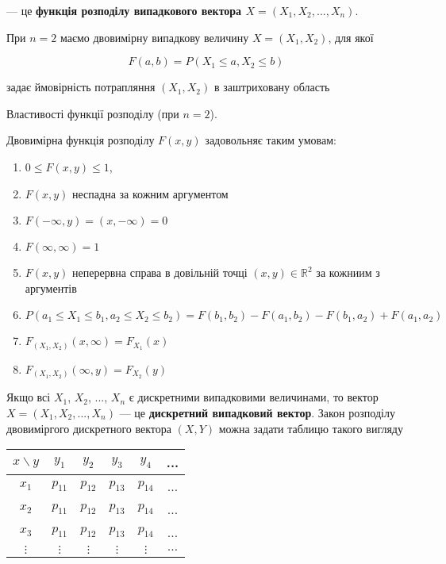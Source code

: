 --- це \textbf{функція розподілу випадкового вектора $X = (X_1, X_2, ..., X_n)$}.

При $n = 2$ маємо двовимірну випадкову величину $X = (X_1, X_2)$, для якої 

$$F(a, b)
= P(X_1 \leqslant a, X_2 \leqslant b)$$

задає ймовірність потрапляння $(X_1, X_2)$ в заштриховану область

\beautifulImage

Властивості функції розподілу (при $n = 2$).

\begin{theorem}Двовимірна функція розподілу $F(x, y)$ задовольняє таким умовам:
    \begin{enumerate}
        \item $0 \leqslant F(x, y) \leqslant 1$,
        \item $F(x, y)$ неспадна за кожним аргументом
        \item $F(-\infty, y) = (x, -\infty) = 0$
        \item $F(\infty, \infty) = 1$
        \item $F(x, y)$ неперервна справа в довільній точці $(x, y) \in \mathbb{R}^2$
        за кожниим з аргументів
        \item $P(a_1 \leqslant X_1 \leqslant b_1, a_2 \leqslant X_2 \leqslant b_2)
        = F(b_1, b_2) - F(a_1, b_2) - F(b_1, a_2) + F(a_1, a_2)$
        \item $F_{(X_1, X_2)}(x, \infty) = F_{X_1}(x)$
        \item $F_{(X_1, X_2)}(\infty, y) = F_{X_2}(y)$
    \end{enumerate}
\end{theorem}

Якщо всі $X_1$, $X_2$, ..., $X_n$ є дискретними випадковими величинами,
то вектор $X = (X_1, X_2, ..., X_n)$ --- це \textbf{дискретний випадковий вектор}.
Закон розподілу двовиміргого дискретного вектора $(X, Y)$ можна задати таблицю
такого вигляду

\begin{center}
    \begin{tabular}{c|ccccc}
        $x \backslash y$ & $y_1$ & $y_2$ & $y_3$ & $y_4$ & ... \\
        \hline $x_1$ & $p_{11}$ & $p_{12}$ & $p_{13}$ & $p_{14}$ & ... \\
        $x_2$ & $p_{11}$ & $p_{12}$ & $p_{13}$ & $p_{14}$ & ... \\
        $x_3$ & $p_{11}$ & $p_{12}$ & $p_{13}$ & $p_{14}$ & ... \\
        $\vdots$ & $\vdots$ & $\vdots$ & $\vdots$ & $\vdots$ & $\ldots$ \\
    \end{tabular}
\end{center}


